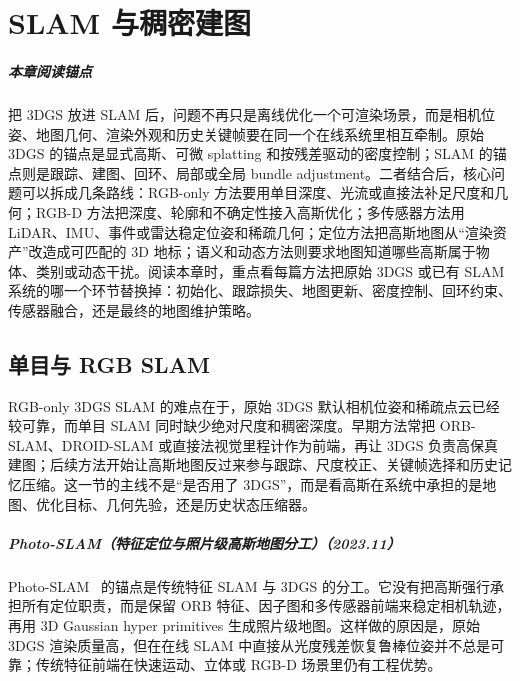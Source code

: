 \chapter{SLAM 与稠密建图}

\paragraph*{本章阅读锚点}
把 3DGS 放进 SLAM 后，问题不再只是离线优化一个可渲染场景，而是相机位姿、地图几何、渲染外观和历史关键帧要在同一个在线系统里相互牵制。原始 3DGS 的锚点是显式高斯、可微 splatting 和按残差驱动的密度控制；SLAM 的锚点则是跟踪、建图、回环、局部或全局 bundle adjustment。二者结合后，核心问题可以拆成几条路线：RGB-only 方法要用单目深度、光流或直接法补足尺度和几何；RGB-D 方法把深度、轮廓和不确定性接入高斯优化；多传感器方法用 LiDAR、IMU、事件或雷达稳定位姿和稀疏几何；定位方法把高斯地图从“渲染资产”改造成可匹配的 3D 地标；语义和动态方法则要求地图知道哪些高斯属于物体、类别或动态干扰。阅读本章时，重点看每篇方法把原始 3DGS 或已有 SLAM 系统的哪一个环节替换掉：初始化、跟踪损失、地图更新、密度控制、回环约束、传感器融合，还是最终的地图维护策略。

\section{单目与 RGB SLAM}

RGB-only 3DGS SLAM 的难点在于，原始 3DGS 默认相机位姿和稀疏点云已经较可靠，而单目 SLAM 同时缺少绝对尺度和稠密深度。早期方法常把 ORB-SLAM、DROID-SLAM 或直接法视觉里程计作为前端，再让 3DGS 负责高保真建图；后续方法开始让高斯地图反过来参与跟踪、尺度校正、关键帧选择和历史记忆压缩。这一节的主线不是“是否用了 3DGS”，而是看高斯在系统中承担的是地图、优化目标、几何先验，还是历史状态压缩器。



\paragraph{Photo-SLAM（特征定位与照片级高斯地图分工）（2023.11）}
Photo-SLAM~\cite{2311_16728} 的锚点是传统特征 SLAM 与 3DGS 的分工。它没有把高斯强行承担所有定位职责，而是保留 ORB 特征、因子图和多传感器前端来稳定相机轨迹，再用 3D Gaussian hyper primitives 生成照片级地图。这样做的原因是，原始 3DGS 渲染质量高，但在在线 SLAM 中直接从光度残差恢复鲁棒位姿并不总是可靠；传统特征前端在快速运动、立体或 RGB-D 场景里仍有工程优势。

